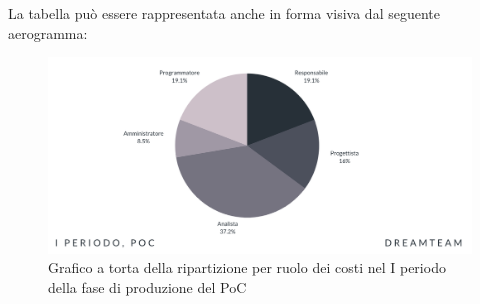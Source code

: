 La tabella può essere rappresentata anche in forma visiva dal seguente aerogramma:
\begin{figure}[H]
\centering
\includegraphics[scale=0.65]{Sezioni/SezioniPreventivo/grafici/Poc_I_periodo_costi.png}
\caption{Grafico a torta della ripartizione per ruolo dei costi nel I periodo della fase di produzione del PoC}
\end{figure}



